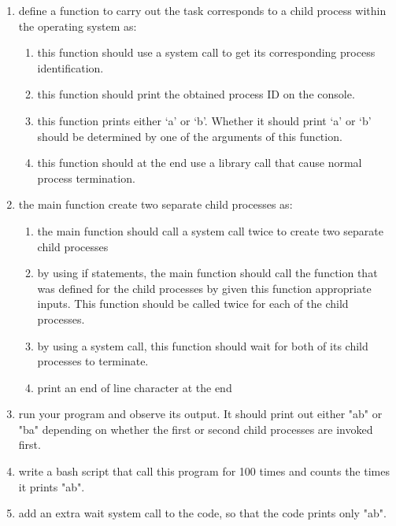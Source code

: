 \documentclass[16pt]{article}
\begin{document}
\begin{enumerate}
\item define a function to carry out the task corresponds to a child process within the operating system as:
\begin{enumerate}
\item this function should use a system call to get its corresponding process identification.
\item this function should print the obtained process ID on the console.
\item this function prints either `a' or `b'. Whether it should print `a' or `b' should be determined by one of the arguments of this function.
\item this function should at the end use a library call that cause normal process termination. 
\end{enumerate}

\item the main function create two separate child processes as:
\begin{enumerate}
\item the main function should call a system call twice to create two separate child processes
\item by using if statements, the main function should call the function that was defined for the child processes by given this function appropriate inputs. This function should be called twice for each of the child processes.
\item by using a system call, this function should wait for both of its child processes to terminate.
\item print an end of line character at the end
\end{enumerate}

\item run your program and observe its output. It should print out either "ab" or "ba" depending on whether the first or second child processes are invoked first.

\item write a bash script that call this program for 100 times and counts the times it prints "ab".

\item add an extra wait system call to the code, so that the code prints only "ab".  


\end{enumerate}
\end{document}
